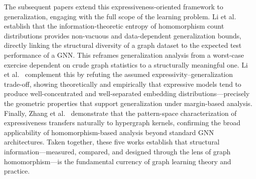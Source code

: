 \documentclass[12pt]{article}
\begin{document}
The subsequent papers extend this expressiveness-oriented framework to
generalization, engaging with the full scope of the learning problem.
Li et al.~\cite{li2024generalization} establish that the information-theoretic entropy of
homomorphism count distributions provides non-vacuous and data-dependent
generalization bounds, directly linking the structural diversity of a graph
dataset to the expected test performance of a GNN. This reframes generalization
analysis from a worst-case exercise dependent on crude graph statistics to a
structurally meaningful one. Li et al.~\cite{li2025towards} complement this by refuting
the assumed expressivity--generalization trade-off, showing theoretically and
empirically that expressive models tend to produce well-concentrated and
well-separated embedding distributions---precisely the geometric properties that
support generalization under margin-based analysis. Finally,
Zhang et al.~\cite{zhang2026reinterpreting} demonstrate that the pattern-space
characterization of expressiveness transfers naturally to hypergraph kernels,
confirming the broad applicability of homomorphism-based analysis beyond standard
GNN architectures. Taken together, these five works establish that structural
information---measured, compared, and designed through the lens of graph
homomorphism---is the fundamental currency of graph learning theory and practice.



\end{document}

